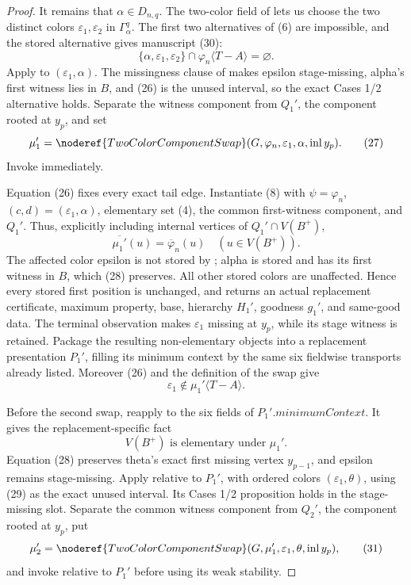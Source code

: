 \begin{proof}
It remains that \(\alpha\in D_{n,q}\).  The two-color field of
 lets us choose the two distinct colors
\(\varepsilon_1,\varepsilon_2\) in \(\Gamma^q_\alpha\).  The first two
alternatives of (6) are impossible, and the stored alternative gives
manuscript (30):
\[
 \{\alpha,\varepsilon_1,\varepsilon_2\}\cap
       \varphi_n\langle T-A\rangle=\varnothing.               \tag{26}
\]
Apply  to \((\varepsilon_1,\alpha)\).  The missingness
clause of  makes epsilon stage-missing, alpha's first
witness lies in \(B\), and (26) is the
unused interval, so the exact Cases 1/2 alternative holds.  Separate the
witness component from \(Q_1'\), the component rooted at \(y_p\), and set
\[
 \mu_1'=\noderef{TwoColorComponentSwap}
       (G,\varphi_n,\varepsilon_1,\alpha,
        \operatorname{inl}y_p).                               \tag{27}
\]
Invoke  immediately.

Equation (26) fixes every exact tail edge.  Instantiate (8) with
\(\psi=\varphi_n\), \((c,d)=(\varepsilon_1,\alpha)\), elementary set
(4), the common first-witness component, and \(Q_1'\).  Thus, explicitly
including internal vertices of \(Q_1'\cap V(B^+)\),
\[
 \overline{\mu_1'}(u)=\overline\varphi_n(u)
                           \quad(u\in V(B^+)).                 \tag{28}
\]
The affected color epsilon is not stored by
; alpha is stored and has its first
witness in \(B\), which (28) preserves.  All other stored colors are
unaffected.  Hence every stored first position is unchanged, and
 returns an actual replacement
 certificate, maximum property,
base, hierarchy \(H_1'\), goodness \(g_1'\), and same-good
data.  The terminal observation makes \(\varepsilon_1\) missing at
\(y_p\), while its stage witness is retained.  Package the resulting
non-elementary objects into a replacement presentation \(P_1'\), filling
its minimum context by the same six fieldwise transports already listed.
Moreover (26) and the definition of the swap give
\[
       \varepsilon_1\notin\mu_1'\langle T-A\rangle.           \tag{29}
\]

Before the second swap, reapply
 to the six fields
of \(P_1'.\mathit{minimumContext}\).  It gives the replacement-specific
fact
\[
                 V(B^+)\text{ is elementary under }\mu_1'.    \tag{30}
\]
Equation (28) preserves theta's exact first missing vertex
\(y_{p-1}\), and epsilon remains stage-missing.  Apply
 relative to \(P_1'\), with ordered colors
\((\varepsilon_1,\theta)\), using (29) as the exact unused interval.  Its
Cases 1/2 proposition holds in the stage-missing slot.  Separate the
common witness component from \(Q_2'\), the component rooted at \(y_p\),
put
\[
 \mu_2'=\noderef{TwoColorComponentSwap}
       (G,\mu_1',\varepsilon_1,\theta,
        \operatorname{inl}y_p),                               \tag{31}
\]
and invoke  relative to \(P_1'\) before
using its weak stability.


\end{proof}
